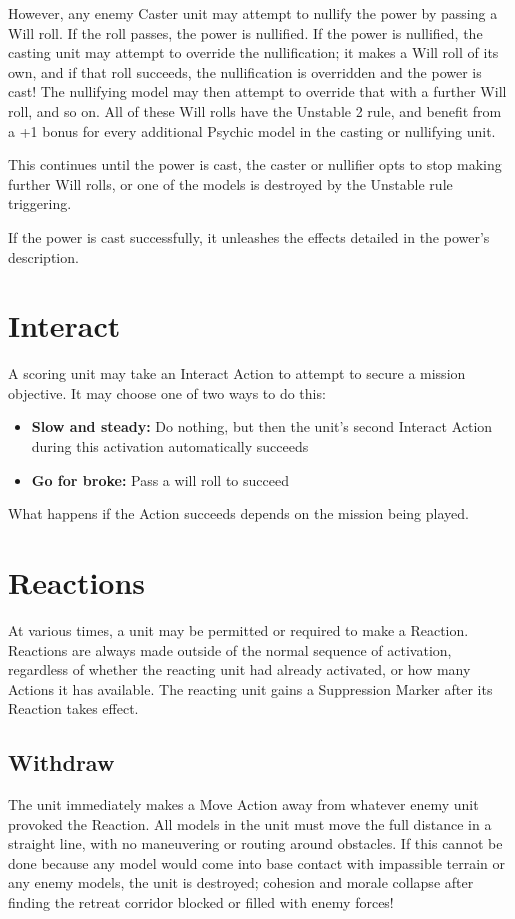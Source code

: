 \begin{multicols}{2}
However, any enemy Caster unit may attempt to nullify the power by passing a Will roll. If the roll passes, the power is nullified. If the power is nullified, the casting unit may attempt to override the nullification; it makes a Will roll of its own, and if that roll succeeds, the nullification is overridden and the power is cast! The nullifying model may then attempt to override that with a further Will roll, and so on. All of these Will rolls have the Unstable 2 rule, and benefit from a +1 bonus for every additional Psychic model in the casting or nullifying unit.

This continues until the power is cast, the caster or nullifier opts to stop making further Will rolls, or one of the models is destroyed by the Unstable rule triggering.

If the power is cast successfully, it unleashes the effects detailed in the power's description.




\section*{Interact}
A scoring unit may take an Interact Action to attempt to secure a mission objective. It may choose one of two ways to do this:
\begin{itemize}
    \item \textbf{Slow and steady:} Do nothing, but then the unit's second Interact Action during this activation automatically succeeds
    \item \textbf{Go for broke:} Pass a will roll to succeed
\end{itemize}

What happens if the Action succeeds depends on the mission being played.




\section*{Reactions}
At various times, a unit may be permitted or required to make a Reaction. Reactions are always made outside of the normal sequence of activation, regardless of whether the reacting unit had already activated, or how many Actions it has available. The reacting unit gains a Suppression Marker after its Reaction takes effect.



\subsection*{Withdraw}
The unit immediately makes a Move Action away from whatever enemy unit provoked the Reaction. All models in the unit must move the full distance in a straight line, with no maneuvering or routing around obstacles. If this cannot be done because any model would come into base contact with impassible terrain or any enemy models, the unit is destroyed; cohesion and morale collapse after finding the retreat corridor blocked or filled with enemy forces!




\end{multicols}
